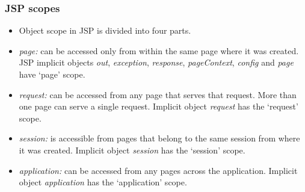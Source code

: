 \documentclass[10pt,xcolor=pdflatex]{beamer}
\begin{document}
\begin{frame}\frametitle{JSP scopes}
	\begin{itemize}
		\item Object scope in JSP is divided into four parts.
		\item \emph{page:}  can be accessed only from within the same page where it was created. JSP implicit objects \emph{out}, \emph{exception}, \emph{response}, \emph{pageContext}, \emph{config} and \emph{page} have ‘page’ scope.
		\item \emph{request:}  can be accessed from any page that serves that request. More than one page can serve a single request. Implicit object \emph{request} has the ‘request’ scope.
		\item \emph{session:}  is accessible from pages that belong to the same session from where it was created. Implicit object \emph{session} has the ‘session’ scope.
		\item \emph{application:} can be accessed from any pages across the application. Implicit object \emph{application} has the ‘application’ scope.
    \end{itemize}
\end{frame}
\end{document}
